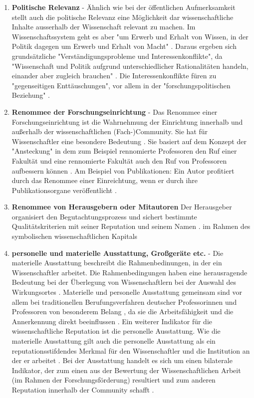 \begin{enumerate}
\item \textbf{Politische Relevanz} - Ähnlich wie bei der öffentlichen Aufmerksamkeit stellt auch die politische Relevanz eine Möglichkeit dar wissenschaftliche Inhalte ausserhalb der Wissenschaft relevant zu machen. Im Wissenschaftssystem geht es aber "um Erwerb und Erhalt von Wissen, in der Politik dagegen um Erwerb und Erhalt von Macht" \cite{Mayntz_1996}. Daraus ergeben sich grundsätzliche "Verständigungsprobleme und Interessenkonflikte", da  "Wissenschaft und Politik aufgrund unterschiedlicher Rationalitäten handeln, einander aber zugleich brauchen" \cite{Mayntz_1996}. Die Interessenkonflikte füren zu "gegenseitigen Enttäuschungen", vor allem in der "forschungspolitischen Beziehung" \cite{Mayntz_1996}.
\item \textbf{Renommee der Forschungseinrichtung} -
Das Renommee einer Forschungseinrichtung ist die Wahrnehmung der Einrichtung innerhalb und außerhalb der wissenschaftlichen (Fach-)Community. Sie hat für Wissenschaftler eine besondere Bedeutung \cite{mayntz_2008_wissensproduktion}. Sie basiert auf dem Konzept der "Ansteckung" in dem zum Beispiel rennomierte Professoren den Ruf einer Fakultät und eine rennomierte Fakultät auch den Ruf von Professoren aufbessern können \cite{luhmann_1970_selbststeuerung}. Am Beispiel von Publikationen: Ein Autor profitiert durch das Renommee einer Einreichtung, wenn er durch ihre Publikationsorgane veröffentlicht \cite{lutz_2012_zugang}.
\item \textbf{Renommee von Herausgebern oder Mitautoren} Der Herausgeber organisiert den Begutachtungsprozess und sichert bestimmte Qualitätskriterien mit seiner Reputation und seinem Namen \cite{mueller_2009_peerreview}.
im Rahmen des symbolischen wissenschaftlichen Kapitals
\item \textbf{personelle und materielle Ausstattung, Großgeräte etc.} -
Die materielle Ausstattung beschreibt die Rahmenbedinungen, in der ein Wissenschaftler arbeitet. Die Rahmenbedingungen haben eine herausragende Bedeutung bei der Überlegung von Wissenschaftlern bei der Auswahl des Wirkungsortes \cite{mayntz_2008_wissensproduktion}. Materielle und personelle Ausstattung gemeinsam sind vor allem bei traditionellen Berufungsverfahren deutscher Professorinnen und Professoren von besonderem Belang \cite{himpele_2011_job}, da sie die Arbeitsfähigkeit und die Annerkennung direkt beeinflussen \cite{suche}. Ein weiterer Indikator für die wissenschaftliche Reputation ist die personelle Ausstattung. Wie die materielle Ausstattung gilt auch die personelle Ausstattung als ein reputationsstifdendes Merkmal für den Wissenschaftler und die Institution an der er arbeitet \cite{mayntz_2008_wissensproduktion}. Bei der Ausstattung handelt es sich um einen bilaterale Indikator, der zum einen aus der Bewertung der Wissenschaftlichen Arbeit (im Rahmen der Forschungsförderung) resultiert \cite{Herb_vermessung_2008} und  zum anderen Reputation innerhalb der Community schafft \cite{mayntz_2008_wissensproduktion}.

\end{enumerate}
